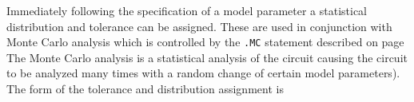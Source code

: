 \label{.MODELstatementTOL}
Immediately following the specification of a model parameter
a statistical distribution and tolerance can be assigned.
These are used in conjunction with Monte Carlo analysis which is controlled
by the {\tt .MC} statement described on page
\pageref{.MCstatement}
The Monte Carlo analysis is a statistical analysis of the circuit causing
the circuit to be analyzed many times with a random change of certain model
parameters). The form of the tolerance and distribution assignment is\\[0.1in]
\hspace*{\fill}\\[0.1in]
